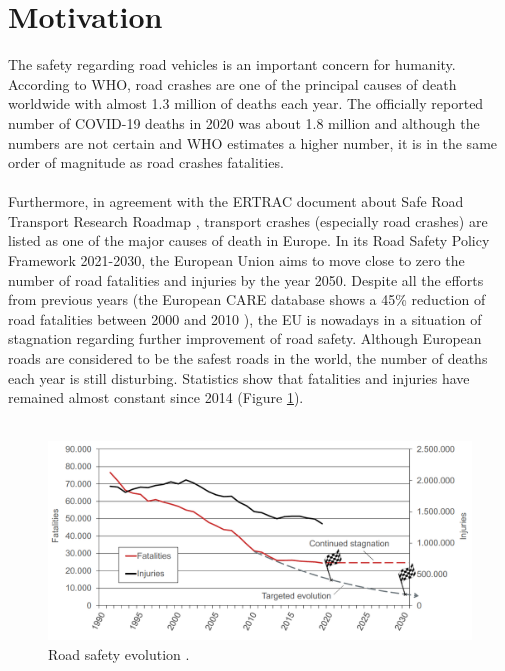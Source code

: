 \section{Motivation}
    The safety regarding road vehicles is an important concern for humanity. According to \ac{WHO}, road crashes are one of the principal causes of death worldwide with almost 1.3 million \cite{who} of deaths each year. The officially reported number of COVID-19 deaths in 2020 was about 1.8 million \cite{covid} and although the numbers are not certain and \ac{WHO} estimates a higher number, it is in the same order of magnitude as road crashes fatalities.
    \\
    \\
    Furthermore, in agreement with the \ac{ERTRAC} document about Safe Road Transport Research Roadmap \cite{ertrac}, transport crashes (especially road crashes) are listed as one of the major causes of death in Europe. In its Road Safety Policy Framework 2021-2030, the European Union aims to move close to zero the number of road fatalities and injuries by the year 2050. Despite all the efforts from previous years (the European CARE database shows a 45\% reduction of road fatalities between 2000 and 2010 \cite{care}), the EU is nowadays in a situation of stagnation regarding further improvement of road safety. Although European roads are considered to be the safest roads in the world, the number of deaths each year is still disturbing.
    Statistics show \cite{ertrac} that fatalities and injuries have remained almost constant since 2014 (Figure \ref{fig:road_safety}). 
    \\
    \\
    \begin{figure}[ht] 
    \centering
    \captionsetup{justification=centering}
    \includegraphics[width=\textwidth]{Images/Road_safety_evolution.png}
    \caption[Road safety evolution]{Road safety evolution \parencite{ertrac}.}
    \label{fig:road_safety}
    \vspace{-0.5em}
    \end{figure}

